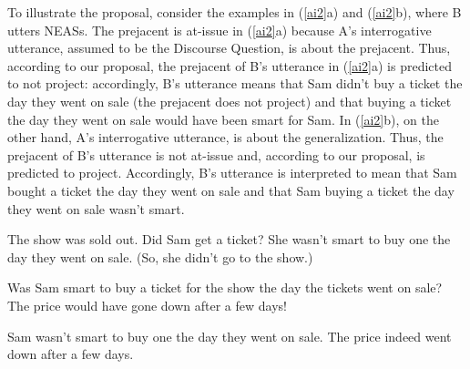 \documentclass[11pt,fleqn]{article}
\newcommand{\6}{\mbox{$[\hspace*{-.6mm}[$}}
\newcommand{\9}{\mbox{$]\hspace*{-.6mm}]$}}
\begin{document}
To illustrate the proposal, consider the examples in (\ref{ai2}a) and (\ref{ai2}b), where B utters NEASs. The prejacent is at-issue in (\ref{ai2}a) because A's interrogative utterance, assumed to be the Discourse Question, is about the prejacent. Thus, according to our proposal, the prejacent of B's utterance in (\ref{ai2}a) is predicted to not project: accordingly, B's utterance means that Sam didn't buy a ticket the day they went on sale (the prejacent does not project) and that buying a ticket the day they went on sale would have been smart for Sam. In (\ref{ai2}b), on the other hand, A's interrogative utterance, is about the generalization. Thus, the prejacent of B's utterance is not at-issue and, according to our proposal, is predicted to project. Accordingly, B's utterance is interpreted to mean that Sam bought a ticket the day they went on sale and that Sam buying a ticket the day they went on sale wasn't smart. 


\begin{exe}
\ex\label{ai2}

\begin{xlist}
\ex
\begin{xlist}
 The show was sold out. Did Sam get a ticket?
 She wasn't smart to buy one the day they went on sale. (So, she didn't go to the show.)
\end{xlist}

\ex
\begin{xlist}
 Was Sam smart to buy a ticket for the show the day the tickets went on sale? The price would have gone down after a few days!

 Sam wasn't smart to buy one the day they went on sale. The price indeed went down after a few days.

\end{xlist}

\end{xlist}
\end{exe}
\end{document}
